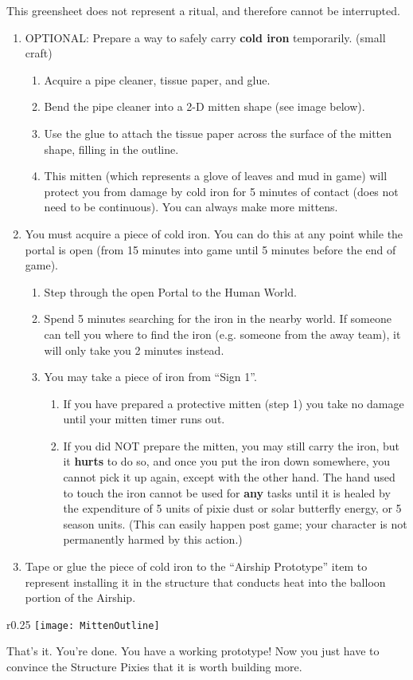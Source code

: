 \documentclass[green]{PP}
\begin{document}
\name{\gAirship{}}
This greensheet does not represent a ritual, and therefore cannot be interrupted.

\begin{enumerate}
	\item OPTIONAL: Prepare a way to safely carry \textbf{cold iron} temporarily. (small craft)
	\begin{enumerate}
		\item Acquire a pipe cleaner, tissue paper, and glue.
		\item Bend the pipe cleaner into a 2-D mitten shape (see image below).
		\item Use the glue to attach the tissue paper across the surface of the mitten shape, filling in the outline.
		\item This mitten (which represents a glove of leaves and mud in game) will protect you from damage by cold iron for 5 minutes of contact (does not need to be continuous). You can always make more mittens.
	\end{enumerate}
	\item You must acquire a piece of cold iron. You can do this at any point while the portal is open (from 15 minutes into game until 5 minutes before the end of game).
	\begin{enumerate}
		\item Step through the open Portal to the Human World.
		\item Spend 5 minutes searching for the iron in the nearby world. If someone can tell you where to find the iron (e.g. someone from the away team), it will only take you 2 minutes instead.
		\item You may take a piece of iron from “Sign 1”.
		\begin{enumerate}
			\item If you have prepared a protective mitten (step 1) you take no damage until your mitten timer runs out.
			\item If you did NOT prepare the mitten, you may still carry the iron, but it \textbf{hurts} to do so, and once you put the iron down somewhere, you cannot pick it up again, except with the other hand. The hand used to touch the iron cannot be used for \textbf{any} tasks until it is healed by the expenditure of 5 units of pixie dust or solar butterfly energy, or 5 season units. (This can easily happen post game; your character is not permanently harmed by this action.)
		\end{enumerate}
	\end{enumerate}
	\item Tape or glue the piece of cold iron to the “Airship Prototype” item to represent installing it in the structure that conducts heat into the balloon portion of the Airship.
\end{enumerate}

\begin{wrapfigure}{r}{0.25\textwidth} %
    \centering
		\texttt{[image: MittenOutline]}
\end{wrapfigure}


That’s it. You’re done. You have a working prototype! Now you just have to convince the Structure Pixies that it is worth building more.
\end{document}
